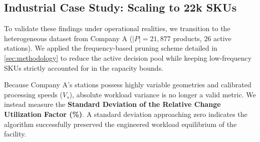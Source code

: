 \documentclass[preprint,review,11pt,authoryear]{elsarticle}
\begin{document}
\subsection{Industrial Case Study: Scaling to 22k SKUs}
To validate these findings under operational realities, we transition to the heterogeneous dataset from Company A ($|P|=21,877$ products, 26 active stations). We applied the frequency-based pruning scheme detailed in \cref{sec:methodology} to reduce the active decision pool while keeping low-frequency SKUs strictly accounted for in the capacity bounds.

Because Company A's stations possess highly variable geometries and calibrated processing speeds ($V_s$), absolute workload variance is no longer a valid metric. We instead measure the \textbf{Standard Deviation of the Relative Change Utilization Factor (\%)}. A standard deviation approaching zero indicates the algorithm successfully preserved the engineered workload equilibrium of the facility.
\end{document}

